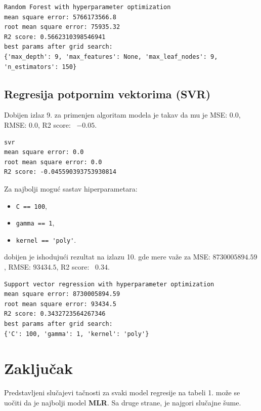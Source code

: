 \documentclass[fontsize=12bp, paper=a4]{scrarticle}
\begin{document}
\begin{lstlisting}[caption=\centering Slučajne šume sa optimizacijom hiperparametrima]
Random Forest with hyperparameter optimization
mean square error: 5766173566.8
root mean square error: 75935.32
R2 score: 0.5662310398546941
best params after grid search: 
{'max_depth': 9, 'max_features': None, 'max_leaf_nodes': 9, 'n_estimators': 150}
\end{lstlisting}

\subsection{Regresija potpornim vektorima (SVR)}
Dobijen izlaz 9. za primenjen algoritam  modela je takav da mu je MSE: $0.0$, RMSE: $0.0$, R2 score: ~$-0.05$.

\begin{lstlisting}[caption=\centering SVR]
svr
mean square error: 0.0
root mean square error: 0.0
R2 score: -0.045590393753930814
\end{lstlisting}

Za najbolji moguć sastav hiperparametara:
\begin{itemize}
    \item \verb|C == 100|,
    \item \verb|gamma == 1|,
    \item \verb|kernel == 'poly'|.
\end{itemize}
dobijen je ishodujući rezultat na izlazu 10. gde mere važe za MSE: $8730005894.59$, RMSE: $93434.5$, R2 score: ~$0.34$.

\begin{lstlisting}[caption=\centering SVR sa optimizacijom hiperparametrima]
Support vector regression with hyperparameter optimization
mean square error: 8730005894.59
root mean square error: 93434.5
R2 score: 0.3432723564267346
best params after grid search: 
{'C': 100, 'gamma': 1, 'kernel': 'poly'}
\end{lstlisting}


\newpage
\section{Zaključak}
Predstavljeni slučajevi tačnosti za svaki model regresije na tabeli 1. može se uočiti da je najbolji model \textbf{MLR}. Sa druge strane, je najgori slučajne šume. 
\end{document}
